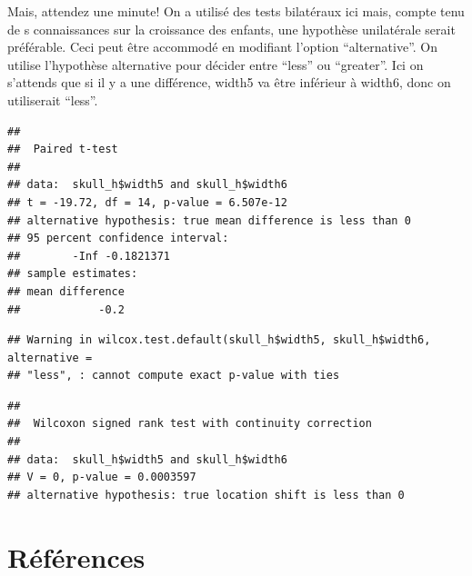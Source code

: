 \documentclass[
  12pt,
]{book}
\newenvironment{Shaded}{\begin{snugshade}}{\end{snugshade}}
\newcommand{\DataTypeTok}[1]{\textcolor[rgb]{0.13,0.29,0.53}{#1}}
\newcommand{\KeywordTok}[1]{\textcolor[rgb]{0.13,0.29,0.53}{\textbf{#1}}}
\newcommand{\NormalTok}[1]{#1}
\newcommand{\OperatorTok}[1]{\textcolor[rgb]{0.81,0.36,0.00}{\textbf{#1}}}
\newcommand{\OtherTok}[1]{\textcolor[rgb]{0.56,0.35,0.01}{#1}}
\newcommand{\StringTok}[1]{\textcolor[rgb]{0.31,0.60,0.02}{#1}}
\begin{document}
Mais, attendez une minute! On a utilisé des tests bilatéraux ici mais, compte tenu de s connaissances sur la croissance des enfants, une hypothèse unilatérale serait préférable. Ceci peut être accommodé en modifiant l'option ``alternative''. On utilise l'hypothèse alternative pour décider entre ``less'' ou ``greater''. Ici on s'attends que si il y a une différence, width5 va être inférieur à width6, donc on utiliserait ``less''.

\begin{Shaded}
\end{Shaded}

\begin{verbatim}
## 
##  Paired t-test
## 
## data:  skull_h$width5 and skull_h$width6
## t = -19.72, df = 14, p-value = 6.507e-12
## alternative hypothesis: true mean difference is less than 0
## 95 percent confidence interval:
##        -Inf -0.1821371
## sample estimates:
## mean difference 
##            -0.2
\end{verbatim}

\begin{Shaded}
\end{Shaded}

\begin{verbatim}
## Warning in wilcox.test.default(skull_h$width5, skull_h$width6, alternative =
## "less", : cannot compute exact p-value with ties
\end{verbatim}

\begin{verbatim}
## 
##  Wilcoxon signed rank test with continuity correction
## 
## data:  skull_h$width5 and skull_h$width6
## V = 0, p-value = 0.0003597
## alternative hypothesis: true location shift is less than 0
\end{verbatim}

\hypertarget{ruxe9fuxe9rences}{%
\section{Références}\label{ruxe9fuxe9rences}}
\end{document}
